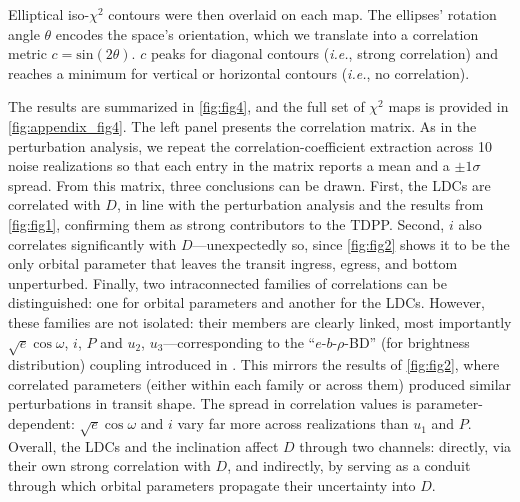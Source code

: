 \documentclass[twocolumn]{aastex631}
\newcommand{\vtwo}[1]{{#1}}
\begin{document}
Elliptical iso-$\chi^2$ contours were then overlaid \vtwo{on} each map. The ellipses' rotation angle $\theta$ encodes the space's orientation, which we translate into a correlation metric $c = \mathrm{sin}(2\theta)$. $c$ peaks for diagonal contours (\textit{i.e.}, strong correlation) and reaches a minimum for vertical or horizontal contours (\textit{i.e.}, no correlation). 

The results are summarized in \autoref{fig:fig4}, and the full set of $\chi^2$ maps is provided in \autoref{fig:appendix_fig4}. The left panel presents the correlation matrix. \vtwo{As in the perturbation analysis, we repeat the correlation-coefficient extraction across 10 noise realizations so that each entry in the matrix reports a mean and a $\pm1\sigma$ spread.} From this matrix, \vtwo{three} conclusions can be drawn. First, \vtwo{the LDCs are correlated with $D$, in line with the perturbation analysis and the results from \autoref{fig:fig1}, confirming them as strong contributors to the TDPP}. \vtwo{Second, $i$ also correlates significantly with $D$---unexpectedly so, since \autoref{fig:fig2} shows it to be the only orbital parameter that leaves the transit ingress, egress, and bottom unperturbed.} \vtwo{Finally,} two intraconnected families of correlations can be distinguished: one for orbital parameters and another for the LDCs. However, these families are not isolated: their members are clearly linked, most importantly $\sqrt{e}\cos{\omega}$, $i$, $P$ and $u_2$, $u_3$---corresponding to the ``$e$-$b$-$\rho$-BD” (for brightness distribution) coupling introduced in \citet{deWit2012}. This mirrors the results of \autoref{fig:fig2}, where correlated parameters (either within each family or across them) produced similar perturbations in transit shape. \vtwo{The spread in correlation values is parameter-dependent: $\sqrt{e}\cos{\omega}$ and $i$ vary far more across realizations than $u_1$ and $P$.} Overall, the LDCs \vtwo{and the inclination} affect $D$ through two channels: directly, via their own strong correlation with $D$, and indirectly, by serving as a conduit through which orbital parameters propagate their uncertainty into $D$.
\end{document}
